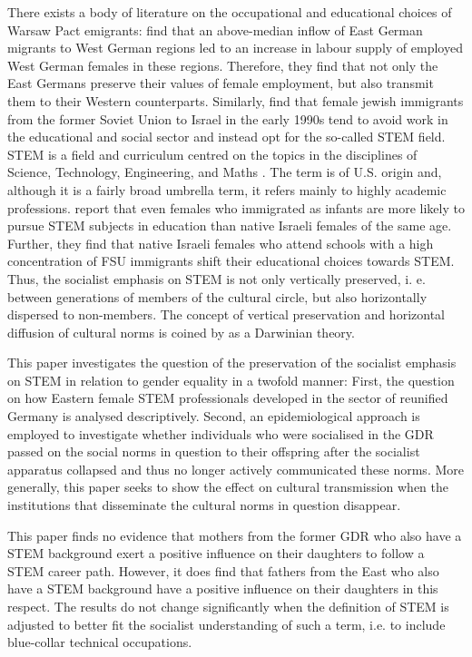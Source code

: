 \documentclass[a4paper, oneside, hyperfootnotes = false]{article}
\begin{document}
{There exists a body of literature on the occupational and educational choices of Warsaw Pact emigrants:
\cite{Jessen2023} find that an above-median inflow of East German migrants to West German regions led to an increase in labour supply of employed West German females in these regions.
Therefore, they find that not only the East Germans preserve their values of female employment, but also transmit them to their Western counterparts.
Similarly, \cite{FriedmanSokuler2020} find that female jewish immigrants from the former Soviet Union to Israel in the early 1990s tend to avoid work in the educational and social sector and instead opt for the so-called STEM field.
STEM is a field and curriculum centred on the topics in the disciplines of Science, Technology, Engineering, and Maths \citep{Hallinen2024}.
The term is of U.S. origin and, although it is a fairly broad umbrella term, it refers mainly to highly academic professions.
\cite{FriedmanSokuler2020} report that even females who immigrated as infants are more likely to pursue STEM subjects in education than native Israeli females of the same age.
Further, they find that native Israeli females who attend schools with a high concentration of FSU immigrants shift their educational choices towards STEM.
Thus, the socialist emphasis on STEM is not only vertically preserved, i. e. between generations of members of the cultural circle, but also horizontally dispersed to non-members.
The concept of vertical preservation and horizontal diffusion of cultural norms is coined by \cite{Boyd1985} as a Darwinian theory.

This paper investigates the question of the preservation of the socialist emphasis on STEM in relation to gender equality in a twofold manner:
First, the question on how Eastern female STEM professionals developed in the sector of reunified Germany is analysed descriptively.
Second, an epidemiological approach is employed to investigate whether individuals who were socialised in the GDR passed on the social norms in question to their offspring after the socialist apparatus collapsed and thus no longer actively communicated these norms.
More generally, this paper seeks to show the effect on cultural transmission when the institutions that disseminate the cultural norms in question disappear.

This paper finds no evidence that mothers from the former GDR who also have a STEM background exert a positive influence on their daughters to follow a STEM career path.
However, it does find that fathers from the East who also have a STEM background have a positive influence on their daughters in this respect.
The results do not change significantly when the definition of STEM is adjusted to better fit the socialist understanding of such a term, i.e. to include blue-collar technical occupations.

}
\end{document}

